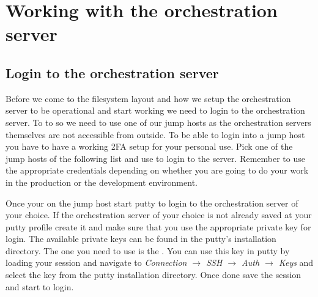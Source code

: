 	\section{Working with the orchestration server}
             \subsection{Login to the orchestration server}
             Before we come to the filesystem layout and how we setup the orchestration server to be operational and start working we need to login to the orchestration server. To to so we need to use one of our jump hosts as the orchestration servers themselves are not accessible from outside. To be able to login into a jump host you have to have a working 2FA setup for your personal use.
             Pick one of the jump hosts of the following list and use \rdp{} to login to the server. Remember to use the appropriate credentials depending on whether you are going to do your work in the production or the development environment.

           Once your on the jump host start putty to login to the orchestration server of your choice. If the orchestration server of your choice is not already saved at your putty profile create it and make sure that you use the appropriate private key for login. The available private keys can be found in the putty's installation directory. The one you need to use is the \emph{\awsstddevkey}. You can use this key in putty by loading your session and navigate to \emph{Connection $\rightarrow$ SSH $\rightarrow$ Auth $\rightarrow$ Keys} and select the key from the putty installation directory. Once done save the session and start to login.
           
